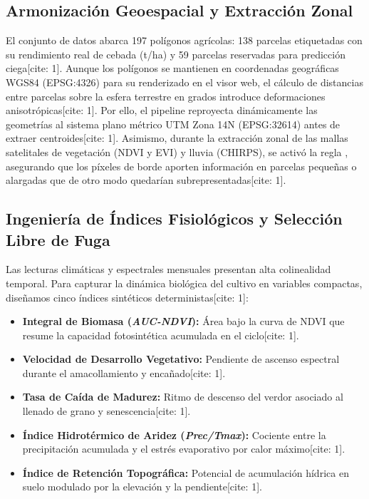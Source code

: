 \documentclass[11pt,a4paper]{article}
\newcommand{\code}[1]{\tcbox[on line, boxsep=1pt, left=3pt, right=3pt, top=1pt, bottom=1pt, colback=mintsoft, colframe=mintsoft, arc=2pt]{\texttt{\footnotesize\color{forestdeep}#1}}}
\begin{document}
\subsection{Armonización Geoespacial y Extracción Zonal}
El conjunto de datos abarca 197 polígonos agrícolas: 138 parcelas etiquetadas con su rendimiento real de cebada (t/ha) y 59 parcelas reservadas para predicción ciega[cite: 1]. Aunque los polígonos se mantienen en coordenadas geográficas WGS84 (EPSG:4326) para su renderizado en el visor web, el cálculo de distancias entre parcelas sobre la esfera terrestre en grados introduce deformaciones anisotrópicas[cite: 1]. Por ello, el pipeline reproyecta dinámicamente las geometrías al sistema plano métrico UTM Zona 14N (EPSG:32614) antes de extraer centroides[cite: 1]. Asimismo, durante la extracción zonal de las mallas satelitales de vegetación (NDVI y EVI) y lluvia (CHIRPS), se activó la regla \code{all\_touched=True}, asegurando que los píxeles de borde aporten información en parcelas pequeñas o alargadas que de otro modo quedarían subrepresentadas[cite: 1].

\subsection{Ingeniería de Índices Fisiológicos y Selección Libre de Fuga}
Las lecturas climáticas y espectrales mensuales presentan alta colinealidad temporal. Para capturar la dinámica biológica del cultivo en variables compactas, diseñamos cinco índices sintéticos deterministas[cite: 1]:
\begin{itemize}
  \item \textbf{Integral de Biomasa (\textit{AUC-NDVI}):} Área bajo la curva de NDVI que resume la capacidad fotosintética acumulada en el ciclo[cite: 1].
  \item \textbf{Velocidad de Desarrollo Vegetativo:} Pendiente de ascenso espectral durante el amacollamiento y encañado[cite: 1].
  \item \textbf{Tasa de Caída de Madurez:} Ritmo de descenso del verdor asociado al llenado de grano y senescencia[cite: 1].
  \item \textbf{Índice Hidrotérmico de Aridez (\textit{Prec/Tmax}):} Cociente entre la precipitación acumulada y el estrés evaporativo por calor máximo[cite: 1].
  \item \textbf{Índice de Retención Topográfica:} Potencial de acumulación hídrica en suelo modulado por la elevación y la pendiente[cite: 1].
\end{itemize}
\end{document}
